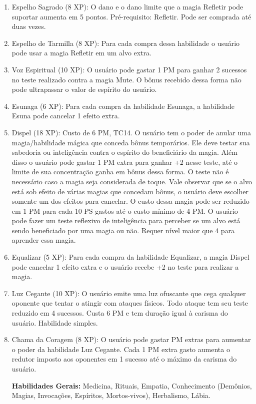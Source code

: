 \begin{enumerate}
	\item Espelho Sagrado (8 XP): O dano e o dano limite que a magia Refletir pode suportar aumenta em 5 pontos. Pré-requisito: Refletir. Pode ser comprada até duas vezes.
	
	\item Espelho de Tarmilla (8 XP): Para cada compra dessa habilidade o usuário pode usar a magia Refletir em um alvo extra.	
	
	\item Voz Espiritual (10 XP): O usuário pode gastar 1 PM para ganhar 2 sucessos no teste realizado contra a magia Mute. O bônus recebido dessa forma não pode ultrapassar o valor de espírito do usuário.

 \item Esunaga (6 XP): Para cada compra da habilidade Esunaga, a habilidade Esuna pode cancelar 1 efeito extra.
 
\item Dispel (18 XP): Custo de 6 PM, TC14.\newline
O usuário tem o poder de anular uma magia/habilidade mágica que conceda bônus temporários. Ele deve testar sua sabedoria ou inteligência contra o espírito do beneficiário da magia. Além disso o usuário pode gastar 1 PM extra para ganhar +2 nesse teste, até o limite de sua concentração ganha em bônus dessa forma. O teste não é necessário caso a magia seja considerada de toque. Vale observar que se o alvo está sob efeito de várias magias que concedam bônus, o usuário deve escolher somente um dos efeitos para cancelar. O custo dessa magia pode ser reduzido em 1 PM para cada 10 PS gastos até o custo mínimo de 4 PM. O usuário pode fazer um teste reflexivo de inteligência para perceber se um alvo está sendo beneficiado por uma magia ou não. Requer nível maior que 4 para aprender essa magia.

\item Equalizar (5 XP): Para cada compra da habilidade Equalizar, a magia Dispel pode cancelar 1 efeito extra e o usuário recebe +2 no teste para realizar a magia.

	\item Luz Cegante (10 XP): O usuário emite uma luz ofuscante que cega qualquer oponente que tentar o atingir com ataques físicos. Todo ataque tem seu teste reduzido em 4 sucessos. Custa 6 PM e tem duração igual à carisma do usuário. Habilidade simples.
 
 	\item Chama da Coragem (8 XP): O usuário pode gastar PM extras para aumentar o poder da habilidade Luz Cegante. Cada 1 PM extra gasto aumenta o redutor imposto aos oponentes em 1 sucesso até o máximo da carisma do usuário.


\textbf{Habilidades Gerais:} Medicina, Rituais, Empatia, Conhecimento (Demônios, Magias, Invocações, Espíritos, Mortos-vivos), Herbalismo, Lábia.
	
\end{enumerate}


